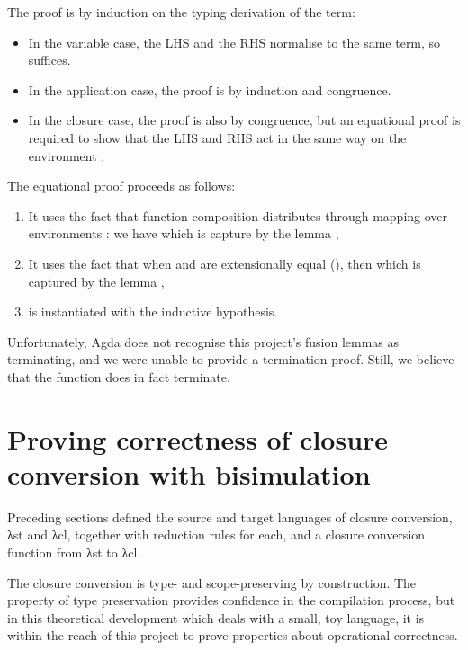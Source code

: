 \documentclass[bsc,frontabs,oneside,singlespacing,parskip,deptreport]{infthesis}
\theoremstyle{definition}
\theoremstyle{lemma}
\begin{document}
The proof is by induction on the typing derivation of the term:

\begin{itemize}
\item In the variable case, the LHS and the RHS normalise to the same
  term, so  suffices.
\item In the application case, the proof is by induction and
  congruence.
\item In the closure case, the proof is also by congruence, but an
  equational proof is required to show that the LHS and RHS act in the
  same way on the environment .
\end{itemize}

The equational proof proceeds as follows:

\begin{enumerate}[nolistsep]
\item It uses the fact that function composition 
  distributes through mapping over environments \AS{\_<\$>\_}: we have
   which is capture by the lemma
  ,
\item It uses the fact that when  and  are extensionally
  equal (), then  which
  is captured by the lemma ,
\item {} is instantiated with the inductive hypothesis.
\end{enumerate}

Unfortunately, Agda does not recognise this project's fusion lemmas as
terminating, and we were unable to provide a termination proof. Still,
we believe that the function does in fact terminate.


\chapter{Proving correctness of closure conversion with bisimulation}
\label{cha:prov-corr-clos}

Preceding sections defined the source and target languages of
closure conversion, λst and λcl, together with reduction rules for
each, and a closure conversion function  from λst to λcl.

The   closure conversion is type- and
scope-preserving by construction. The property of type preservation
provides confidence in the compilation process, but in this
theoretical development which deals with a small, toy language, it is
within the reach of this project to prove properties about operational
correctness. 
\end{document}
